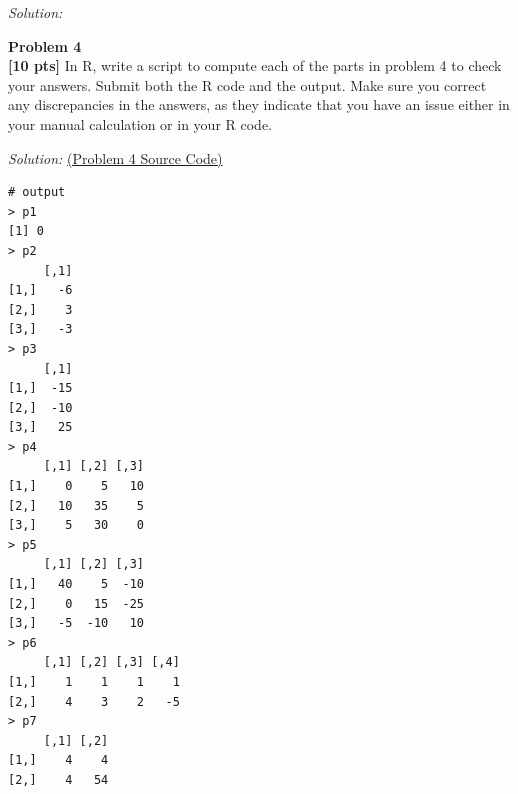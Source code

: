 \documentclass{article}
\newenvironment{problem}[2][Problem]
    { \begin{mdframed}[backgroundcolor=gray!20] \textbf{#1 #2} \\}
    {  \end{mdframed}}
\newenvironment{solution}
    {\textit{Solution:}}
    {}
\begin{document}
\begin{solution}
\begin{figure}[h]
	\end{figure}
\end{solution}

\newpage
\begin{problem}{4}
\textbf{[10 pts]}
In R, write a script to compute each of the parts in problem 4 to check your answers. Submit both the R code and the output. Make sure you correct any discrepancies in the answers, as they indicate that you have an issue either in your manual calculation or in your R code.
\end{problem}
\begin{solution}
\href{run:./src/RCode/p4.r}{ (Problem 4 Source Code)}
\begin{lstlisting}
# output
> p1
[1] 0
> p2
     [,1]
[1,]   -6
[2,]    3
[3,]   -3
> p3
     [,1]
[1,]  -15
[2,]  -10
[3,]   25
> p4
     [,1] [,2] [,3]
[1,]    0    5   10
[2,]   10   35    5
[3,]    5   30    0
> p5
     [,1] [,2] [,3]
[1,]   40    5  -10
[2,]    0   15  -25
[3,]   -5  -10   10
> p6
     [,1] [,2] [,3] [,4]
[1,]    1    1    1    1
[2,]    4    3    2   -5
> p7
     [,1] [,2]
[1,]    4    4
[2,]    4   54
\end{lstlisting}
\end{solution}
\end{document}
